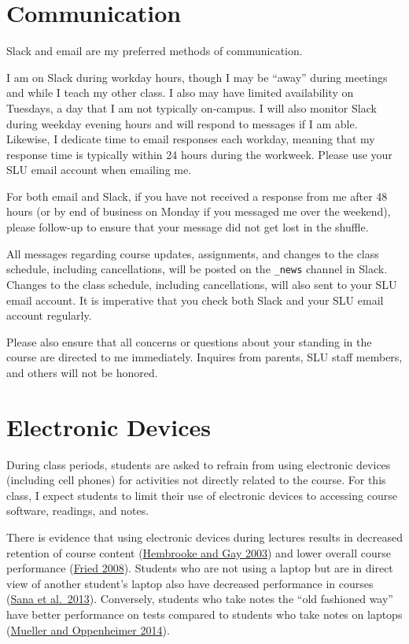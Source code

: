 \documentclass[]{book}
\theoremstyle{definition}
\theoremstyle{definition}
\theoremstyle{definition}
\theoremstyle{remark}
\begin{document}
\hypertarget{communication}{%
\section{Communication}\label{communication}}

Slack and email are my preferred methods of communication.

I am on Slack during workday hours, though I may be ``away'' during
meetings and while I teach my other class. I also may have limited
availability on Tuesdays, a day that I am not typically on-campus. I
will also monitor Slack during weekday evening hours and will respond to
messages if I am able. Likewise, I dedicate time to email responses each
workday, meaning that my response time is typically within 24 hours
during the workweek. Please use your SLU email account when emailing me.

For both email and Slack, if you have not received a response from me
after 48 hours (or by end of business on Monday if you messaged me over
the weekend), please follow-up to ensure that your message did not get
lost in the shuffle.

All messages regarding course updates, assignments, and changes to the
class schedule, including cancellations, will be posted on the
\texttt{\_news} channel in Slack. Changes to the class schedule,
including cancellations, will also sent to your SLU email account. It is
imperative that you check both Slack and your SLU email account
regularly.

Please also ensure that all concerns or questions about your standing in
the course are directed to me immediately. Inquires from parents, SLU
staff members, and others will not be honored.

\hypertarget{electronic-devices}{%
\section{Electronic Devices}\label{electronic-devices}}

During class periods, students are asked to refrain from using
electronic devices (including cell phones) for activities not directly
related to the course. For this class, I expect students to limit their
use of electronic devices to accessing course software, readings, and
notes.

There is evidence that using electronic devices during lectures results
in decreased retention of course content
(\href{https://link.springer.com/article/10.1007/BF02940852}{Hembrooke
and Gay 2003}) and lower overall course performance
(\href{https://www.sciencedirect.com/science/article/pii/S0360131506001436}{Fried
2008}). Students who are not using a laptop but are in direct view of
another student's laptop also have decreased performance in courses
(\href{https://www.sciencedirect.com/science/article/pii/S0360131512002254}{Sana
et al.~2013}). Conversely, students who take notes the ``old fashioned
way'' have better performance on tests compared to students who take
notes on laptops
(\href{http://journals.sagepub.com/doi/abs/10.1177/0956797614524581}{Mueller
and Oppenheimer 2014}).
\end{document}
